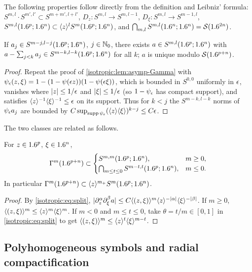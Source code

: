 The following properties follow directly from the definition and Leibniz'
formula: $S^{m,l}\cdot S^{m',l'}\subset S^{m+m',l+l'}$,
$D_z:S^{m,l}\to S^{m,l-1}$, $D_\xi:S^{m,l}\to S^{m-1,l}$,
$S^{m,l}(1.6^p;1.6^n)\subset\langle z\rangle^lS^m(1.6^p;1.6^n)$, and
$\bigcap_{m,l}S^{m,l}(1.6^n;1.6^n)=\mathcal{S}(1.6^{2n})$.

\begin{lemma}\label{isotropic:lem:asymp-sc}
If $a_j\in S^{m-j,l-j}(1.6^p;1.6^n)$, $j\in\mathbb{N}_0$, there exists $a\in S^{m,l}(1.6^p;1.6^n)$
with $a-\sum_{j<k}a_j\in S^{m-k,l-k}(1.6^p;1.6^n)$ for all $k$; $a$ is unique
modulo $\mathcal{S}(1.6^{p+n})$.
\end{lemma}
\begin{proof}
Repeat the proof of \cref{isotropic:lem:asymp-Gamma} with
$\psi_\epsilon(z,\xi)=1-(1-\psi(\epsilon z))(1-\psi(\epsilon\xi))$, which is bounded in
$S^{0,0}$ uniformly in $\epsilon$, vanishes where $|z|\le1/\epsilon$ and
$|\xi|\le1/\epsilon$ (so $1-\psi_\epsilon$ has compact support), and satisfies
$\langle z\rangle^{-1}\langle \xi\rangle^{-1}\le\epsilon$ on its support. Thus for $k<j$ the
$S^{m-k,l-k}$ norms of $\psi_\epsilon a_j$ are bounded by
$C\sup_{\operatorname{supp}\psi_\epsilon}(\langle z\rangle\langle \xi\rangle)^{k-j}\le C\epsilon$.
\end{proof}

The two classes are related as follows.

\begin{lemma}\label{isotropic:lem:Gamma-in-S}
For $z\in1.6^p$, $\xi\in1.6^n$,
\begin{equation*}
  \Gamma^{m}(1.6^{p+n})\subset
  \begin{cases}S^{m,m}(1.6^p;1.6^n),& m\ge0,\\
   \bigcap_{m\le t\le0}S^{m-t,t}(1.6^p;1.6^n),& m\le0.\end{cases}
\end{equation*}
In particular $\Gamma^{m}(1.6^{p+n})\subset\langle z\rangle^{m_+}S^m(1.6^p;1.6^n)$.
\end{lemma}
\begin{proof}
By \eqref{isotropic:eq:split},
$|\partial_z^\alpha\partial_\xi^\beta a|\le C\langle (z,\xi)\rangle^{m}\langle z\rangle^{-|\alpha|}\langle \xi\rangle^{-|\beta|}$.
If $m\ge0$, $\langle (z,\xi)\rangle^m\le\langle z\rangle^m\langle \xi\rangle^m$. If $m<0$ and $m\le t\le0$,
take $\theta=t/m\in[0,1]$ in \eqref{isotropic:eq:split} to get
$\langle (z,\xi)\rangle^m\le\langle z\rangle^{t}\langle \xi\rangle^{m-t}$.
\end{proof}

\subsection{Polyhomogeneous symbols and radial compactification}


